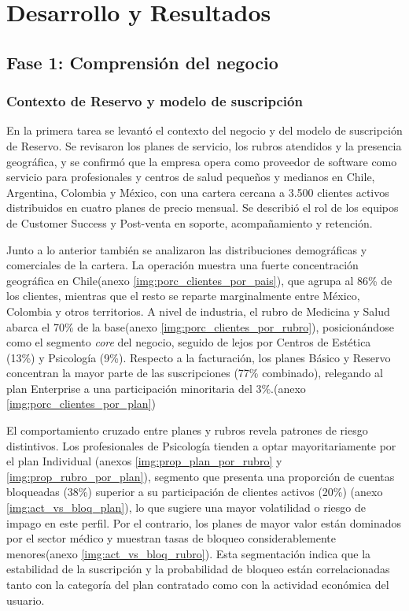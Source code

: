 \newpage
\section{Desarrollo y Resultados}

\subsection{Fase 1: Comprensión del negocio}

\subsubsection{Contexto de Reservo y modelo de suscripción}

En la primera tarea se levantó el contexto del negocio y del modelo de suscripción de Reservo. Se revisaron los planes de servicio, los rubros atendidos y la presencia geográfica, y se confirmó que la empresa opera como proveedor de software como servicio para profesionales y centros de salud pequeños y medianos en Chile, Argentina, Colombia y México, con una cartera cercana a 3.500 clientes activos distribuidos en cuatro planes de precio mensual. Se describió el rol de los equipos de Customer Success y Post-venta en soporte, acompañamiento y retención.

Junto a lo anterior también se analizaron las distribuciones demográficas y comerciales de la cartera. La operación muestra una fuerte concentración geográfica en Chile(anexo \ref{img:porc_clientes_por_pais}), que agrupa al 86\% de los clientes, mientras que el resto se reparte marginalmente entre México, Colombia y otros territorios. A nivel de industria, el rubro de Medicina y Salud abarca el 70\% de la base(anexo \ref{img:porc_clientes_por_rubro}), posicionándose como el segmento \textit{core} del negocio, seguido de lejos por Centros de Estética (13\%) y Psicología (9\%). Respecto a la facturación, los planes Básico y Reservo concentran la mayor parte de las suscripciones (77\% combinado), relegando al plan Enterprise a una participación minoritaria del 3\%.(anexo \ref{img:porc_clientes_por_plan})

El comportamiento cruzado entre planes y rubros revela patrones de riesgo distintivos. Los profesionales de Psicología tienden a optar mayoritariamente por el plan Individual (anexos \ref{img:prop_plan_por_rubro} y \ref{img:prop_rubro_por_plan}), segmento que presenta una proporción de cuentas bloqueadas (38\%) superior a su participación de clientes activos (20\%) (anexo \ref{img:act_vs_bloq_plan}), lo que sugiere una mayor volatilidad o riesgo de impago en este perfil. Por el contrario, los planes de mayor valor están dominados por el sector médico y muestran tasas de bloqueo considerablemente menores(anexo \ref{img:act_vs_bloq_rubro}). Esta segmentación indica que la estabilidad de la suscripción y la probabilidad de bloqueo están correlacionadas tanto con la categoría del plan contratado como con la actividad económica del usuario.


